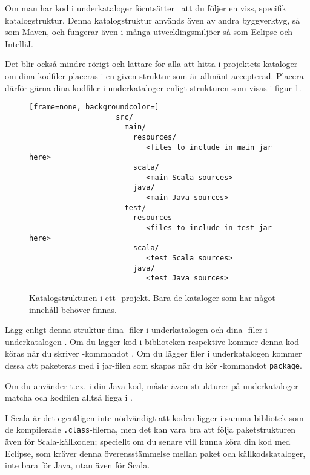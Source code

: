 Om man har kod i underkataloger förutsätter \sbt\ att du följer en viss, specifik katalogstruktur. Denna katalogstruktur används även av andra byggverktyg, så som Maven, och fungerar även i många utvecklingsmiljöer så som Eclipse och IntelliJ. 

Det blir också mindre rörigt och lättare för alla att hitta i projektets kataloger om dina kodfiler placeras i en given struktur som är allmänt accepterad.
Placera därför gärna dina kodfiler i underkataloger enligt strukturen som visas i figur \ref{fig:sbt:dir-structure}. 

\begin{figure}
\centering

\begin{lstlisting}[frame=none, backgroundcolor=]
					src/
					  main/
					    resources/
					       <files to include in main jar here>
					    scala/
					       <main Scala sources>
					    java/
					       <main Java sources>
					  test/
					    resources
					       <files to include in test jar here>
					    scala/
					       <test Scala sources>
					    java/
					       <test Java sources>
\end{lstlisting}

\caption{Katalogstrukturen i ett \sbt-projekt. Bara de kataloger som har något innehåll behöver finnas.}
\label{fig:sbt:dir-structure}
\end{figure}

\noindent Lägg enligt denna struktur dina -filer i underkatalogen  och dina -filer i underkatalogen . Om du lägger kod i biblioteken   respektive  kommer denna kod köras när du skriver \sbt-kommandot . Om du lägger filer i underkatalogen  kommer dessa att paketeras med i jar-filen som skapas när du kör \sbt-kommandot \texttt{package}.

Om du använder t.ex.  i din Java-kod, måste även strukturer på underkataloger matcha och kodfilen alltså ligga i  .

I Scala är det egentligen inte nödvändigt att koden ligger i samma bibliotek som de kompilerade \texttt{.class}-filerna, men det kan vara bra att följa paketstrukturen även för Scala-källkoden; speciellt om du senare vill kunna köra din kod med Eclipse, som kräver denna överensstämmelse mellan paket och källkodskataloger, inte bara för Java, utan även för Scala.


